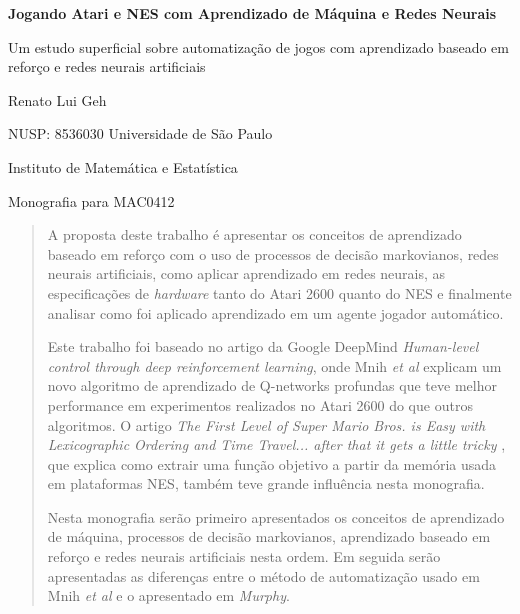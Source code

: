 \documentclass[a4paper,10pt]{article}
\theoremstyle{plain}
\begin{document}
\begin{titlepage}
  \begin{center}
    \LARGE
    \textbf{Jogando Atari e NES com Aprendizado de Máquina e Redes Neurais}

    \vspace{1.7cm}
    \Large
    Um estudo superficial sobre automatização de jogos com aprendizado baseado em reforço e
    redes neurais artificiais

    \vspace{1.7cm}
    \Large
    Renato Lui Geh

    NUSP: 8536030
    \vfill
    \Large
    Universidade de São Paulo

    Instituto de Matemática e Estatística

    Monografia para MAC0412
    \vspace{1.5cm}
  \end{center}
\end{titlepage}

\newpage
\null\vspace{\fill}
\begin{abstract}
  \large
  A proposta deste trabalho é apresentar os conceitos de aprendizado baseado em reforço com o uso
  de processos de decisão markovianos, redes neurais artificiais, como aplicar aprendizado em redes
  neurais, as especificações de \textit{hardware} tanto do Atari 2600 quanto do NES e finalmente
  analisar como foi aplicado aprendizado em um agente jogador automático.

  Este trabalho foi baseado no artigo da Google DeepMind \textit{Human-level control through deep
  reinforcement learning}\cite{mnih-et-al}, onde Mnih \textit{et al} explicam um novo algoritmo de
  aprendizado de Q-networks profundas que teve melhor performance em experimentos realizados no
  Atari 2600 do que outros algoritmos. O artigo \textit{The First Level of Super Mario Bros. is
  Easy with Lexicographic Ordering and Time Travel... \small{after that it gets a little tricky}}
  \cite{dr-murphy}, que explica como extrair uma função objetivo a partir da memória usada em
  plataformas NES, também teve grande influência nesta monografia.

  Nesta monografia serão primeiro apresentados os conceitos de aprendizado de máquina, processos
  de decisão markovianos, aprendizado baseado em reforço e redes neurais artificiais nesta ordem.
  Em seguida serão apresentadas as diferenças entre o método de automatização usado em Mnih
  \textit{et al} e o apresentado em \textit{Murphy}.
\end{abstract}
\vspace{\fill}
\newpage
\large
\tableofcontents
\normalsize
\newpage
\end{document}
